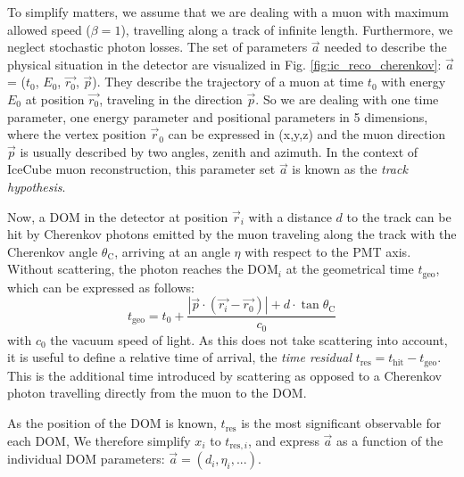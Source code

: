 To simplify matters, we assume that we are dealing with a muon with maximum allowed speed ($\beta=1$), travelling along a track of infinite length. Furthermore, we neglect stochastic photon losses. The set of parameters $\vec{a}$ needed to describe the physical situation in the detector are visualized in Fig. \ref{fig:ic_reco_cherenkov}: $\vec{a}$ = ($t_0$, $E_0$, $\vec{r_0}$, $\vec{p}$). They describe the trajectory of a muon at time $t_0$ with energy $E_0$ at position $\vec{r_0}$, traveling in the direction $\vec{p}$. So we are dealing with one time parameter, one energy parameter and positional parameters in 5 dimensions, where the vertex position $\vec{r}_0$ can be expressed in (x,y,z) and the muon direction $\vec{p}$ is usually described by two angles, zenith and azimuth. In the context of IceCube muon reconstruction, this parameter set $\vec{a}$ is known as the \textit{track hypothesis}.

Now, a DOM in the detector at position $\vec{r}_i$ with a distance $d$ to the track can be hit by Cherenkov photons emitted by the muon traveling along the track with the Cherenkov angle $\theta_\text{C}$, arriving at an angle $\eta$ with respect to the PMT axis. Without scattering, the photon reaches the $\text{DOM}_i$ at the geometrical time $t_\text{geo}$, which can be expressed as follows:
\begin{equation}
t_\text{geo} = t_0 + \frac{|\vec{p}\cdot(\vec{r_i}-\vec{r_0})|+d\cdot \tan{\theta_\text{C}}}{c_0}
\end{equation}
with $c_0$ the vacuum speed of light. As this does not take scattering into account, it is useful to define a relative time of arrival, the \textit{time residual} $t_\text{res} = t_\text{hit} - t_\text{geo}$. This is the additional time introduced by scattering as opposed to a Cherenkov photon travelling directly from the muon to the DOM.

As the position of the DOM is known, $t_\text{res}$ is the most significant observable for each DOM,  We therefore simplify $x_i$ to $t_{\text{res},i}$, and express $\vec{a}$ as a function of the individual DOM parameters: $\vec{a}= (d_i,\eta_i,...)$.



